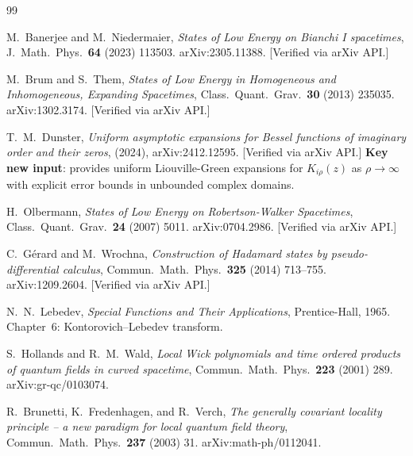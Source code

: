 \documentclass[11pt]{article}
\theoremstyle{definition}
\begin{document}
\begin{thebibliography}{99}

M.~Banerjee and M.~Niedermaier,
\emph{States of Low Energy on Bianchi I spacetimes},
J.~Math.\ Phys.\ \textbf{64} (2023) 113503.
arXiv:2305.11388. [Verified via arXiv API.]

M.~Brum and S.~Them,
\emph{States of Low Energy in Homogeneous and Inhomogeneous, Expanding Spacetimes},
Class.\ Quant.\ Grav.\ \textbf{30} (2013) 235035.
arXiv:1302.3174. [Verified via arXiv API.]

T.~M.~Dunster,
\emph{Uniform asymptotic expansions for Bessel functions of imaginary order and their zeros},
(2024), arXiv:2412.12595. [Verified via arXiv API.]
\textbf{Key new input}: provides uniform Liouville-Green expansions for $K_{i\rho}(z)$
as $\rho\to\infty$ with explicit error bounds in unbounded complex domains.

H.~Olbermann,
\emph{States of Low Energy on Robertson-Walker Spacetimes},
Class.\ Quant.\ Grav.\ \textbf{24} (2007) 5011.
arXiv:0704.2986. [Verified via arXiv API.]

C.~G\'{e}rard and M.~Wrochna,
\emph{Construction of Hadamard states by pseudo-differential calculus},
Commun.\ Math.\ Phys.\ \textbf{325} (2014) 713--755.
arXiv:1209.2604. [Verified via arXiv API.]

N.~N.~Lebedev,
\emph{Special Functions and Their Applications},
Prentice-Hall, 1965. Chapter~6: Kontorovich--Lebedev transform.

S.~Hollands and R.~M.~Wald,
\emph{Local Wick polynomials and time ordered products of quantum fields in curved spacetime},
Commun.\ Math.\ Phys.\ \textbf{223} (2001) 289.
arXiv:gr-qc/0103074.

R.~Brunetti, K.~Fredenhagen, and R.~Verch,
\emph{The generally covariant locality principle -- a new paradigm for local quantum field theory},
Commun.\ Math.\ Phys.\ \textbf{237} (2003) 31.
arXiv:math-ph/0112041.

\end{thebibliography}
\end{document}

